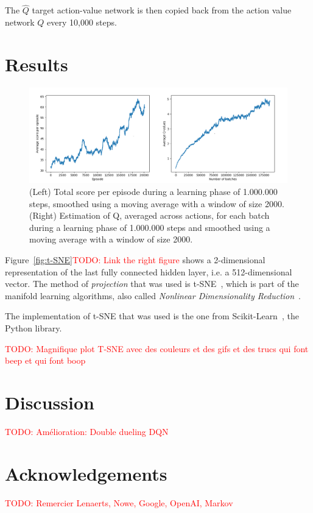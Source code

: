 \documentclass[letterpaper]{article}
\newcommand\todo[1]{\textcolor{red}{TODO: #1}}
\begin{document}
The $\hat Q$ target action-value network is then copied back from the action value network $Q$ every 10,000 steps.

\section{Results}

\begin{figure}
  \includegraphics[width=\textwidth]{figures/dqn_uniform}
  \caption{(Left) Total score per episode during a learning phase of 1.000.000 steps, smoothed using a moving average with a window of size 2000.
     (Right) Estimation of Q, averaged across actions, for each batch during a learning phase of 1.000.000 steps and smoothed using a moving average
      with a window of size 2000.}
\end{figure}

Figure~\ref{fig:t-SNE}\todo{Link the right figure} shows a 2-dimensional representation of the last fully connected hidden layer, i.e. a 512-dimensional
vector. The method of \textit{projection} that was used is t-SNE~\citep{maaten2008visualizing}, which is part of the manifold learning algorithms, also
called \textit{Nonlinear Dimensionality Reduction}~\citep{lee2007nonlinear}.

The implementation of t-SNE that was used is the one from Scikit-Learn~\citep{scikit-learn}, the Python library.

  \todo{Magnifique plot T-SNE avec des couleurs et des gifs et des trucs qui font beep et qui font boop}~\citep{wattenberg2016how}

\section{Discussion}

  \todo{Amélioration: Double dueling DQN}~\citep{DBLP:journals/corr/WangFL15}

\section{Acknowledgements}

  \todo{Remercier Lenaerts, Nowe, Google, OpenAI, Markov}

\newpage
\footnotesize


\end{document}

